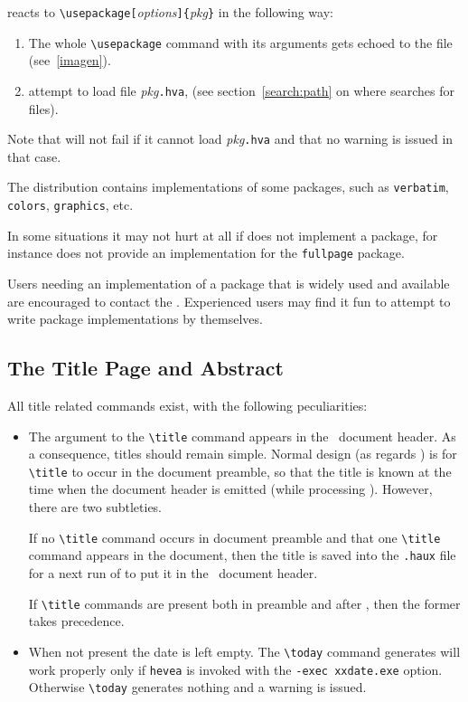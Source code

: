\hevea{} reacts to
\verb+\usepackage[+\textit{options}\verb+]{+\textit{pkg}\verb+}+ in
the following way:
\begin{enumerate}
\item  The whole
\verb+\usepackage+ command with its arguments gets echoed to the
 file (see~\ref{imagen}).
\item \hevea{} attempt to load file \textit{pkg}\texttt{.hva},
(see section~\ref{search:path} on where \hevea{} searches for files).
\end{enumerate}
Note that \hevea{} will not fail if it cannot load
\textit{pkg}\texttt{.hva} and that no warning is issued in that case.

The \hevea{} distribution contains implementations of some packages,
such as \texttt{verbatim}, \texttt{colors}, \texttt{graphics}, etc.

In some situations it may not hurt at all if \hevea{} does not
implement a package, for instance \hevea{} does not provide an
implementation for the \texttt{fullpage} package.

Users needing an implementation of a package that is widely used and
available are encouraged to contact the
.
Experienced users may find it fun to attempt to write package
implementations by themselves.


\subsection{The Title Page and Abstract}
All title related commands exist, with the following peculiarities:
\begin{itemize}
  \item
  The argument to the \verb+\title+ command appears
  in the \html{}~document header. As a consequence, titles should
  remain simple. Normal design (as regards \hevea{}) is for
  \verb+\title+ to occur in the document preamble, so that the title
  is known at the time when the document header is emitted (while
  processing \verb++). However, there are two subtleties.

  If no \verb+\title+
  command occurs in document preamble and that one \verb+\title+
  command appears in the document, then the title is saved into the
  \texttt{.haux} file for a next run of \hevea{} to put it in the
  \html{}~document header.

  If \verb+\title+ commands are present both in preamble and after
 \verb++, then the former takes precedence.

 \item When not present the date is left empty. The
 \verb+\today+ command generates will work properly
 only if \texttt{hevea} is invoked with the \verb+-exec xxdate.exe+
 option.  Otherwise \verb+\today+ generates nothing and a warning is
 issued.
\end{itemize}

